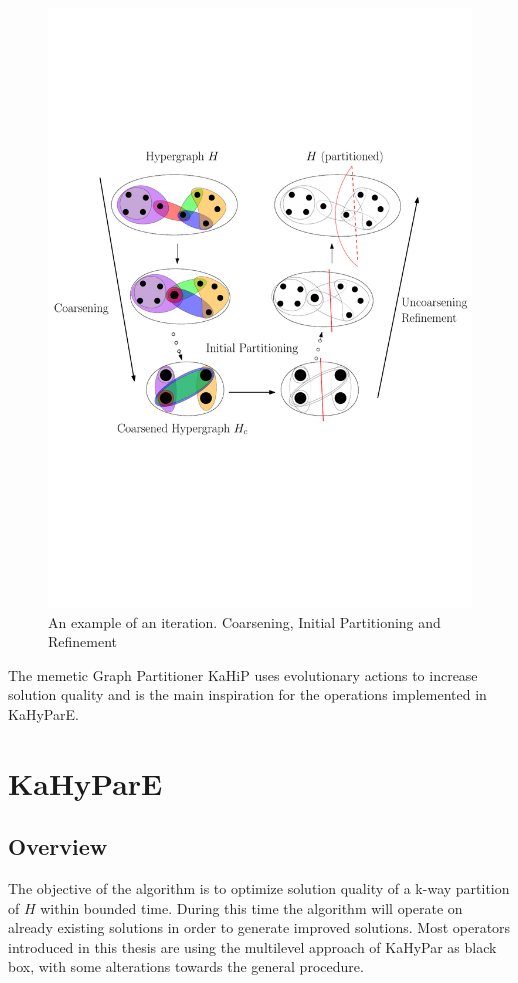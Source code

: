 \documentclass[a4paper,12pt,bibtotoc,titlepage, liststotoc,BCOR7mm,headsepline,pointlessnumbers]{scrbook}
\numberwithin{equation}{section}
\begin{document}
\begin{figure}[t!] 
    \vspace*{-.25cm}
  \centering
   \includegraphics[width=.8\textwidth]{Ipe/Memetic_process.pdf}
  \caption{An example of an iteration. Coarsening, Initial Partitioning and Refinement}\label{fig:img.png} %
    \vspace*{-.5cm}
\end{figure}

The memetic Graph Partitioner KaHiP uses evolutionary actions to increase solution quality and is the main inspiration for the operations implemented in KaHyParE.
\chapter{KaHyParE}
\section{Overview}
The objective of the algorithm is to optimize solution quality of a k-way partition of $H$ within bounded time. During this time
the algorithm will operate on already existing solutions in order to generate improved solutions. Most operators introduced in this 
thesis are using the multilevel approach of KaHyPar as black box, with some alterations towards the general procedure.  
\end{document}
